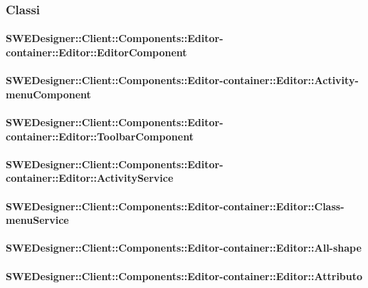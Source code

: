 		\subsubsection{Classi}
		
			\paragraph{SWEDesigner::Client::Components::Editor-container::Editor::EditorComponent}
				
				
			\paragraph{SWEDesigner::Client::Components::Editor-container::Editor::Activity-menuComponent}
				
				
			\paragraph{SWEDesigner::Client::Components::Editor-container::Editor::ToolbarComponent}
				
				
			\paragraph{SWEDesigner::Client::Components::Editor-container::Editor::ActivityService}
				
				
			\paragraph{SWEDesigner::Client::Components::Editor-container::Editor::Class-menuService}
				
				
			\paragraph{SWEDesigner::Client::Components::Editor-container::Editor::All-shape}
				
				
			\paragraph{SWEDesigner::Client::Components::Editor-container::Editor::Attributo}
				
			

